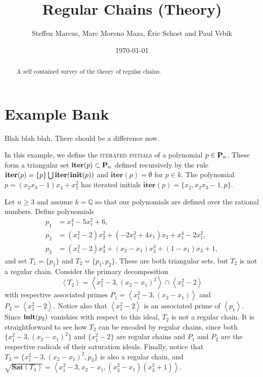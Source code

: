 \documentclass[12pt]{article}
\title{Regular Chains (Theory)}
\author{Steffen Marcus, Marc Moreno Maza, \'Eric Schost and Paul Vrbik}
\date{\today}
\newcommand{\Emph}[1]{\textsc{#1}}
\begin{document}
\maketitle


\begin{abstract}
A self contained survey of the theory of regular chains.
\end{abstract}

\section*{Example Bank}

Blah blah blah. There should be a difference now.

\begin{example}  
In this example, we define the \Emph{iterated initials} of a polynomial $p\in\mathbf{P}_n$.  These form a triangular set $\textbf{iter}(p)\subset \mathbf{P}_n$ defined recursively by the rule $\textbf{iter}(p)=\{p\}\bigcup\textbf{iter}(\textbf{init}(p))$ and $\textbf{iter}(p) = \emptyset$ for $p\in k$.  The polynomial $p=(x_2x_3-1)x_4+x_2^2$ has iterated initials $\textbf{iter}(p)=\{x_2,x_2x_3-1,p\}$.
\end{example}

\begin{example}   
Let $n\geq 3$ and assume $k=\mathbb{Q}$ so that our polynomials are defined over the rational numbers.  Define polynomials
\begin{align*}
p_1 &= x_1^4-5x_1^2+6,\\
p_2 &=(x_1^2-2)x_2^2+(-2x_1^3+4x_1)x_2+x_1^4-2x_1^2,\\
p_3 &=(x_1^2-2)x_3^4+(x_2-x_1)x_3^3+(1-x_1)x_3+1,
\end{align*}
and set $T_1=\{p_1\}$ and $T_2=\{p_1,p_2\}$.  These are both triangular sets, but $T_2$ is not a regular chain.  Consider the primary decomposition
\[
\left<T_2\right>=\left<x_1^2-3,(x_2-x_1)^2\right>\cap\left<x_1^2-2\right>
\]
with respective associated primes $P_1=\left<x_1^2-3,(x_2-x_1)\right>$ and $P_2=\left<x_1^2-2\right>.$  Notice also that $\left<x_1^2-2\right>$ is an associated prime of $\left<p_1\right>$.  Since $\textbf{init}(p_2)$ vanishies with respect to this ideal, $T_2$ is not a regular chain.  It is straightforward to see how $T_2$ can be encoded by regular chains, since both $\{x_1^2-3,(x_2-x_1)^2\}$ and $\{x_1^2-2\}$ are regular chains and $P_1$ and $P_2$ are the respective radicals of their saturation ideals.  Finally, notice that $T_3=\{x_1^2-3,(x_2-x_1)^2, p_3\}$ is also a regular chain, and $\sqrt{\textbf{Sat}(T_3)}=\left<x_1^2-3,x_2-x_1, (x_3^2-x_1)(x_3^2+1)\right>$.
\end{example}
\end{document}
